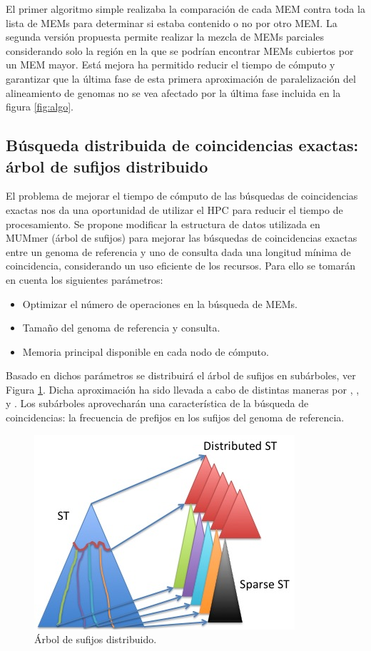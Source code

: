 \documentclass[12pt,a4paper]{article}
\begin{document}
El primer algoritmo simple realizaba la comparación de cada MEM contra toda la lista de MEMs para determinar si estaba contenido o no por otro MEM. La segunda versión propuesta permite realizar la mezcla de MEMs parciales considerando solo la región en la que se podrían encontrar MEMs cubiertos por un MEM mayor. Está mejora ha permitido reducir el tiempo de cómputo y garantizar que la última fase de esta primera aproximación de paralelización del alineamiento de genomas no se vea afectado por la última fase incluida en la figura \ref{fig:algo}.
\subsection{Búsqueda distribuida de coincidencias exactas: árbol de sufijos distribuido}
\indent
El problema de mejorar el tiempo de cómputo de las búsquedas de coincidencias 
exactas nos da una oportunidad de utilizar el HPC para reducir el
tiempo de procesamiento. Se propone modificar la estructura de datos utilizada en 
MUMmer (árbol de sufijos) para mejorar las búsquedas de coincidencias exactas entre
un genoma de referencia y uno de consulta dada una longitud mínima de coincidencia,
considerando un uso eficiente de los recursos. Para 
ello se tomarán en cuenta los siguientes parámetros: 
\begin{itemize}
\item Optimizar el número de operaciones en la búsqueda de MEMs.
\item Tamaño del genoma de referencia y consulta.
\item Memoria principal disponible en cada nodo de cómputo.
\end{itemize}
\indent
Basado en dichos parámetros se distribuirá el árbol de sufijos en subárboles, 
ver Figura \ref{fig:estructura}. Dicha aproximación ha sido llevada a cabo de distintas maneras por \cite{Mansour2012}, 
\cite{Japp2004}, \cite{Ghoting2010} y \cite{Sadakane}.
 Los subárboles aprovecharán una característica
de la búsqueda de coincidencias: la frecuencia de prefijos en los sufijos del genoma de referencia.\\ 
\begin{figure}[h]
\begin{center}
\includegraphics[scale=0.8]{distributed.png}
\caption{Árbol de sufijos distribuido.}
\label{fig:estructura}
\end{center}
\end{figure}
\end{document}
